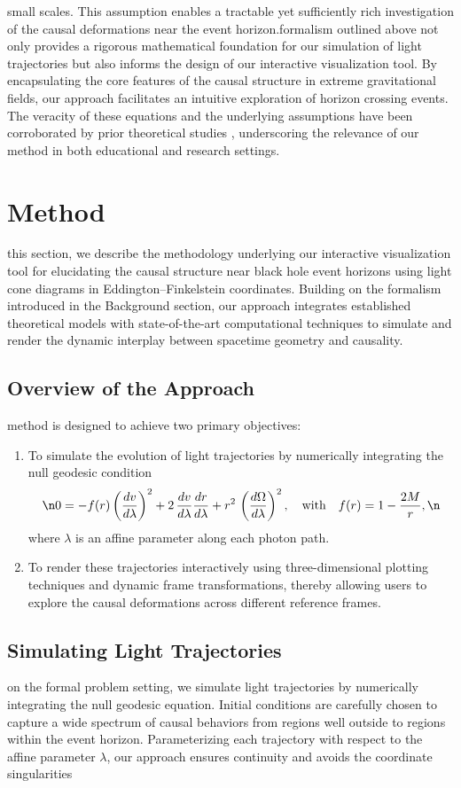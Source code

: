 \documentclass{article}
\begin{document}
small scales. This assumption enables a tractable yet sufficiently rich investigation of the causal deformations near the event horizon.\n\nThe formalism outlined above not only provides a rigorous mathematical foundation for our simulation of light trajectories but also informs the design of our interactive visualization tool. By encapsulating the core features of the causal structure in extreme gravitational fields, our approach facilitates an intuitive exploration of horizon crossing events. The veracity of these equations and the underlying assumptions have been corroborated by prior theoretical studies \cite{ref2}, underscoring the relevance of our method in both educational and research settings.

\section{Method}\nIn this section, we describe the methodology underlying our interactive visualization tool for elucidating the causal structure near black hole event horizons using light cone diagrams in Eddington--Finkelstein coordinates. Building on the formalism introduced in the Background section, our approach integrates established theoretical models with state-of-the-art computational techniques to simulate and render the dynamic interplay between spacetime geometry and causality.\n\n\subsection{Overview of the Approach}\nOur method is designed to achieve two primary objectives:\n\begin{enumerate}\n  \item To simulate the evolution of light trajectories by numerically integrating the null geodesic condition\n  \begin{equation}\n  0 = -f(r)\left(\frac{dv}{d\lambda}\right)^2 + 2\,\frac{dv}{d\lambda}\frac{dr}{d\lambda} + r^2\,\left(\frac{d\Omega}{d\lambda}\right)^2, \quad \text{with} \quad f(r)=1-\frac{2M}{r},\n  \end{equation}\n  where $\lambda$ is an affine parameter along each photon path.\n  \item To render these trajectories interactively using three-dimensional plotting techniques and dynamic frame transformations, thereby allowing users to explore the causal deformations across different reference frames.\n\end{enumerate}\n\n\subsection{Simulating Light Trajectories}\nBased on the formal problem setting, we simulate light trajectories by numerically integrating the null geodesic equation. Initial conditions are carefully chosen to capture a wide spectrum of causal behaviors from regions well outside to regions within the event horizon. Parameterizing each trajectory with respect to the affine parameter $\lambda$, our approach ensures continuity and avoids the coordinate singularities 
\end{document}
